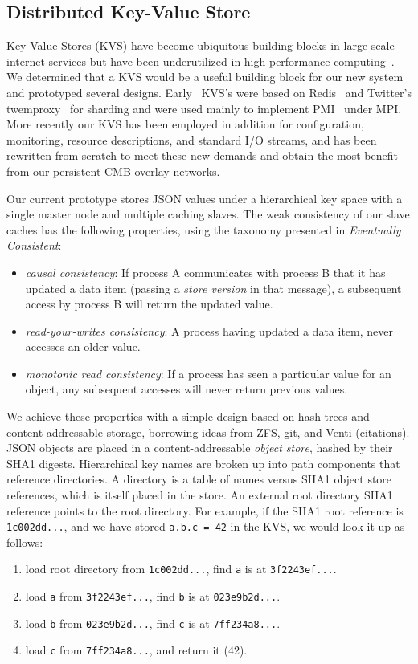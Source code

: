 \subsection{Distributed Key-Value Store}

Key-Value Stores (KVS) have become ubiquitous building blocks in large-scale
internet services but have been underutilized in high performance
computing~\cite{Wang:2013:USE:2503210.2503239}.
We determined that a KVS would be a
useful building block for our new system and prototyped several designs.
Early \flux\ KVS's were based on Redis~\cite{Redis} and Twitter's
twemproxy~\cite{Twemproxy} for sharding and were used mainly to implement
PMI~\cite{PMI2} under MPI.  More recently our KVS has been employed 
in addition for configuration, monitoring, resource descriptions, and
standard I/O streams, and has been rewritten from scratch to meet these
new demands and obtain the most benefit from our persistent CMB overlay
networks.

Our current prototype stores JSON values under a hierarchical key space
with a single master node and multiple caching slaves.  The weak consistency
of our slave caches has the following properties, using the taxonomy
presented in {\em Eventually Consistent}\cite{Vogels:2009:EC:1435417.1435432}:
\begin{itemize}
\item{{\em causal consistency}:  If process A communicates with process B
that it has updated a data item (passing a {\em store version} in that
message), a subsequent access by process B will return the updated value.}
\item{{\em read-your-writes consistency}:  A process having updated a
data item, never accesses an older value.}
\item{{\em monotonic read consistency}:  If a process has seen a particular
value for an object, any subsequent accesses will never return previous values.}
\end{itemize}

We achieve these properties with a simple design based on hash trees
and content-addressable storage, borrowing ideas from ZFS, git, and 
Venti (citations).  JSON objects are placed in a content-addressable
{\em object store}, hashed by their SHA1 digests.
Hierarchical key names are broken up into path components that reference
directories.
A directory is a table of names versus SHA1 object store references,
which is itself placed in the store.  An external root directory SHA1
reference points to the root directory.
For example, if the SHA1 root reference is {\tt 1c002dd...}, and we have
stored {\tt a.b.c = 42} in the KVS, we would look it up as follows:
\begin{enumerate}
\item{load root directory from {\tt 1c002dd...}, find {\tt a} is at
{\tt 3f2243ef...}.}
\item{load {\tt a} from {\tt 3f2243ef...}, find {\tt b} is at
{\tt 023e9b2d...}.}
\item{load {\tt b} from {\tt 023e9b2d...}, find {\tt c} is at
{\tt 7ff234a8...}.}
\item{load {\tt c} from {\tt 7ff234a8...}, and return it (42).}
\end{enumerate}

